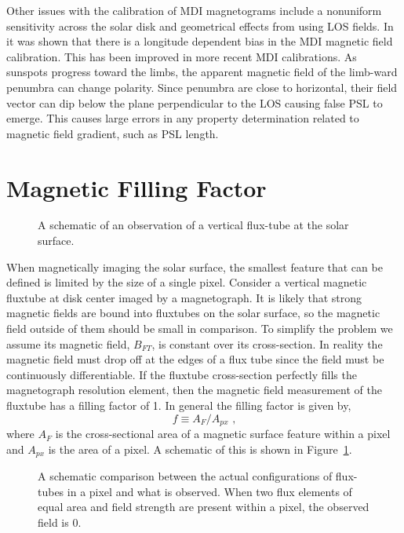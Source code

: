 Other issues with the calibration of \gls{MDI} magnetograms include a nonuniform sensitivity across the solar disk and geometrical effects from using \gls{LOS} fields.  In \cite{Tran:2005} it was shown that there is a longitude dependent bias in the \gls{MDI} magnetic field calibration. This has been improved in more recent \gls{MDI} calibrations. As sunspots progress toward the limbs, the apparent magnetic field of the limb-ward penumbra can change polarity. Since \gls{penumbra} are close to horizontal, their field vector can dip below the plane perpendicular to the \gls{LOS} causing false \gls{PSL} to emerge. This causes large errors in any property determination related to magnetic field gradient, such as \gls{PSL} length.


\section{Magnetic Filling Factor}\label{sect:fillfact}

\begin{figure}[!t]
\caption[A flux-tube observation schematic.]{A schematic of an observation of a vertical flux-tube at the solar surface.}\label{fig:ftschem}
\end{figure}

When magnetically imaging the solar surface, the smallest feature that can be defined is limited by the size of a single pixel. Consider a vertical magnetic \gls{fluxtube} at disk center imaged by a magnetograph. It is likely that strong magnetic fields are bound into \glspl{fluxtube} on the solar surface, so the magnetic field outside of them should be small in comparison. To simplify the problem we assume its magnetic field, $B_{FT}$, is constant over its cross-section. In reality the magnetic field must drop off at the edges of a flux tube since the field must be continuously differentiable. If the \gls{fluxtube} cross-section perfectly fills the magnetograph resolution element, then the magnetic field measurement of the \gls{fluxtube} has a filling factor of 1. In general the filling factor is given by,
\begin{equation}
f \equiv A_{F}/A_{px} \mbox{ ,}
\end{equation}
where $A_{F}$ is the cross-sectional area of a magnetic surface feature within a pixel and $A_{px}$ is the area of a pixel. A schematic of this is shown in Figure~\ref{fig:ftschem}.

\begin{figure}[!t]
\caption[A schematic comparison between actual and observed flux-tubes.]{A schematic comparison between the actual configurations of flux-tubes in a pixel and what is observed. When two flux elements of equal area and field strength are present within a pixel, the observed field is 0.}\label{fig:ftschem2}
\end{figure}

